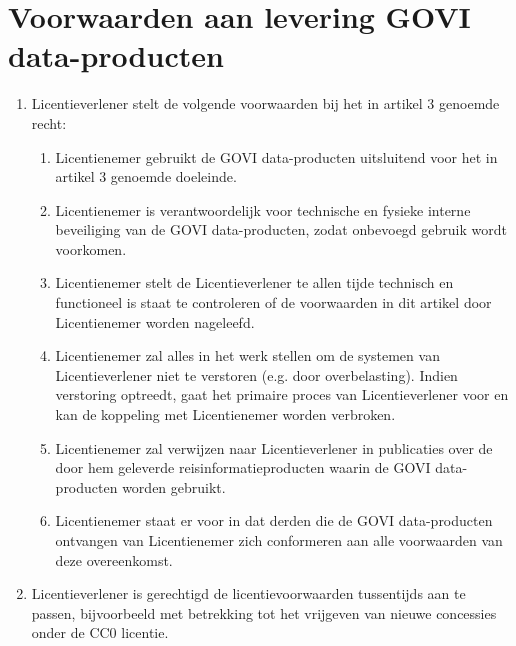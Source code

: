 \documentclass[10pt, a4paper]{article}
\begin{document}
\section{Voorwaarden aan levering GOVI data-producten}
\begin{enumerate}
\item Licentieverlener stelt de volgende voorwaarden bij het in artikel 3 genoemde recht:
    \begin{enumerate}
    \item Licentienemer gebruikt de GOVI data-producten uitsluitend voor het in artikel 3 genoemde doeleinde.
    \item Licentienemer is verantwoordelijk voor technische en fysieke interne beveiliging van de GOVI data-producten, zodat onbevoegd gebruik wordt voorkomen.
    \item Licentienemer stelt de Licentieverlener te allen tijde technisch en functioneel is staat te controleren of de voorwaarden in dit artikel door Licentienemer worden nageleefd.
    \item Licentienemer zal alles in het werk stellen om de systemen van Licentieverlener niet te verstoren (e.g. door overbelasting). Indien verstoring optreedt, gaat het primaire proces van Licentieverlener voor en kan de koppeling met Licentienemer worden verbroken. 
\newpage
    \item Licentienemer zal verwijzen naar Licentieverlener in publicaties over de door hem geleverde reisinformatieproducten waarin de GOVI data-producten worden gebruikt.
    \item Licentienemer staat er voor in dat derden die de GOVI data-producten ontvangen van  Licentienemer zich conformeren aan alle voorwaarden van deze overeenkomst.
    \end{enumerate}
\item Licentieverlener is gerechtigd de licentievoorwaarden tussentijds aan te passen, bijvoorbeeld met betrekking tot het vrijgeven van nieuwe concessies onder de CC0 licentie. 
\end{enumerate}
\end{document}
